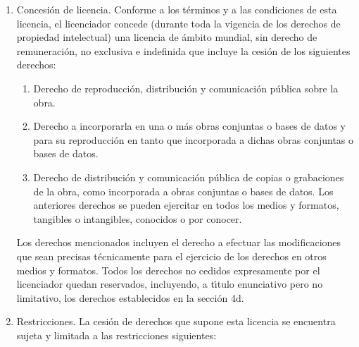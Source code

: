 \begin{enumerate}
\item Concesi\'on de licencia. Conforme a los t\'erminos y a las
  condiciones de esta licencia, el licenciador concede (durante toda
  la vigencia de los derechos de propiedad intelectual) una licencia
  de \'ambito mundial, sin derecho de remuneraci\'on, no exclusiva e
  indefinida que incluye la cesi\'on de los siguientes derechos:

  \begin{enumerate}

  \item Derecho de reproducci\'on, distribuci\'on y comunicaci\'on
    p\'ublica sobre la obra.

  \item Derecho a incorporarla en una o m\'as obras conjuntas o bases
    de datos y para su reproducci\'on en tanto que incorporada a
    dichas obras conjuntas o bases de datos.

  \item Derecho de distribuci\'on y comunicaci\'on p\'ublica de copias
    o grabaciones de la obra, como incorporada a obras conjuntas o
    bases de datos.  Los anteriores derechos se pueden ejercitar en
    todos los medios y formatos, tangibles o intangibles, conocidos o
    por conocer.

  \end{enumerate}

  Los derechos mencionados incluyen el derecho a efectuar las
  modificaciones que sean precisas t\'ecnicamente para el ejercicio de
  los derechos en otros medios y formatos. Todos los derechos no
  cedidos expresamente por el licenciador quedan reservados,
  incluyendo, a t\'\i{}tulo enunciativo pero no limitativo, los
  derechos establecidos en la secci\'on 4d.

\item Restricciones. La cesi\'on de derechos que supone esta licencia
  se encuentra sujeta y limitada a las restricciones siguientes:

  \begin{enumerate}


\end{enumerate}
\end{enumerate}
